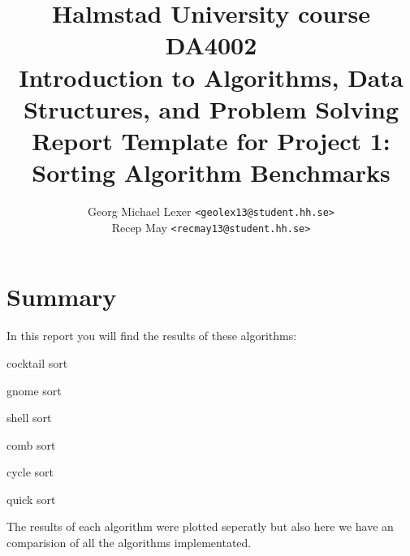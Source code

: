 \documentclass[a4paper,10pt]{article}
\begin{document}
\title{
  {\small
    Halmstad University course DA4002\\
    Introduction to Algorithms, Data Structures, and Problem Solving\\
  }
  Report Template for Project 1:\\
  Sorting Algorithm Benchmarks
}
\author{
  Georg Michael Lexer \texttt{<geolex13@student.hh.se>}\\
  Recep May \texttt{<recmay13@student.hh.se>}
}
\maketitle

{\itshape

}

\newpage

\section*{Summary}

In this report you will find the results of these algorithms:

\smallskip
\begin{compactitem}
\item
cocktail sort
\item
gnome sort
\item
shell sort
\item
comb sort
\item
cycle sort
\item
quick sort
\end{compactitem}

\bigskip
The results of each algorithm were plotted seperatly but also here we have an comparision of all the algorithms implementated.

\bigskip
\bigskip
\bigskip
\bigskip
\end{document}
